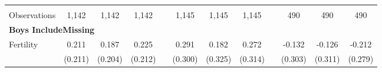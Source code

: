 \begin{landscape}
\begin{table}[htpb!]
\begin{center}
\begin{tabular}{lcccp{2mm}cccp{2mm}ccc}
\begin{footnotesize}\end{footnotesize}&\begin{footnotesize}\end{footnotesize}&\begin{footnotesize}\end{footnotesize}&\begin{footnotesize}\end{footnotesize}&\begin{footnotesize}\end{footnotesize}&\begin{footnotesize}\end{footnotesize}&\begin{footnotesize}\end{footnotesize}&\begin{footnotesize}\end{footnotesize}&\begin{footnotesize}\end{footnotesize}&\begin{footnotesize}\end{footnotesize}&\begin{footnotesize}\end{footnotesize}&\begin{footnotesize}\end{footnotesize}\\Observations&1,142&1,142&1,142&&1,145&1,145&1,145&&490&490&490\\
\multicolumn{12}{l}{\textbf{Boys IncludeMissing}}\\ 
Fertility&0.211&0.187&0.225&&0.291&0.182&0.272&&-0.132&-0.126&-0.212\\
&(0.211)&(0.204)&(0.212)&&(0.300)&(0.325)&(0.314)&&(0.303)&(0.311)&(0.279)\\

\end{tabular}
\end{center}
\end{table}
\end{landscape}
